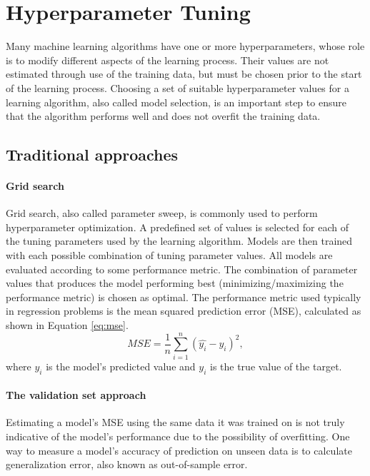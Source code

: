 \chapter{Hyperparameter Tuning} \label{tuning}
Many machine learning algorithms have one or more hyperparameters, whose role is to modify different aspects of the learning process. Their values are not estimated through use of the training data, but must be chosen prior to the start of the learning process. Choosing a set of suitable hyperparameter values for a learning algorithm, also called model selection, is an important step to ensure that the algorithm performs well and does not overfit the training data.

\section{Traditional approaches} \label{sec:trad_tuning}

\subsubsection{Grid search}
Grid search, also called parameter sweep, is commonly used to perform hyperparameter optimization. A predefined set of values is selected for each of the tuning parameters used by the learning algorithm. Models are then trained with each possible combination of tuning parameter values. All models are evaluated according to some performance metric. The combination of parameter values that produces the model performing best (minimizing/maximizing the performance metric) is chosen as optimal. The performance metric used typically in regression problems is the mean squared prediction error (MSE), calculated as shown in Equation \ref{eq:mse}.
\begin{equation} \label{eq:mse}
MSE = \frac{1}{n} \sum_{i=1}^{n} (\hat{y_i}-y_i)^2, 
\end{equation}
where $\hat{y_i}$ is the model's predicted value and $y_i$ is the true value of the target. 

\subsubsection{The validation set approach}
Estimating a model's MSE using the same data it was trained on is not truly indicative of the model's performance due to the possibility of overfitting. One way to measure a model's accuracy of prediction on unseen data is to calculate generalization error, also known as out-of-sample error. 

